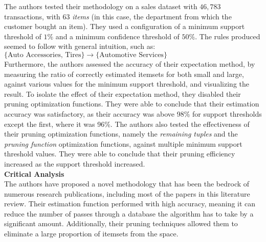 \documentclass[a4paper,11pt]{article}
\begin{document}
The authors tested their methodology on a sales dataset with $46,783$ transactions,  with $63$ \textit{items} (in this case, the department from which the customer bought an item). They used a configuration of a minimum support threshold of $1\%$ and a minimum confidence threshold of $50\%$. The rules produced seemed to follow with general intuition, such as:\\
$\{\text{Auto Accessories, Tires}\} \rightarrow \{\text{Automotive Services}\} $\\
Furthermore, the authors assessed the accuracy of their expectation method, by measuring the ratio of correctly estimated itemsets for both small and large, against various values for the minimum support threshold, and visualizing the result. To isolate the effect of their expectation method, they disabled their pruning optimization functions. They were able to conclude that their estimation accuracy was satisfactory, as their accuracy was above 98\% for support thresholds except the first, where it was 96\%.  The authors also tested the effectiveness of their pruning optimization functions, namely the \textit{remaining tuples} and the \textit{pruning function} optimization functions, against multiple minimum support threshold values. They were able to conclude that their pruning efficiency increased as the support threshold increased.
\\\textbf{Critical Analysis}\\
The authors have proposed a novel methodology that has been the bedrock of numerous research publications,  including most of the papers in this literature review.  Their estimation function performed with high accuracy, meaning it can reduce the number of passes through a database the algorithm has to take by a significant amount. Additionally, their pruning techniques allowed them to eliminate a large proportion of itemsets from the space.
\\\\
\end{document}

